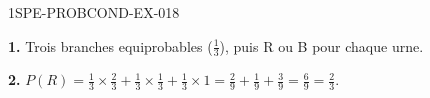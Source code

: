 \begin{corrige}{1SPE-PROBCOND-EX-018}

\textbf{1.} Trois branches equiprobables ($\frac{1}{3}$), puis R ou B pour chaque urne.

\medskip
\textbf{2.} $P(R) = \frac{1}{3} \times \frac{2}{3} + \frac{1}{3} \times \frac{1}{3} + \frac{1}{3} \times 1 = \frac{2}{9} + \frac{1}{9} + \frac{3}{9} = \frac{6}{9} = \frac{2}{3}$.

\end{corrige}
